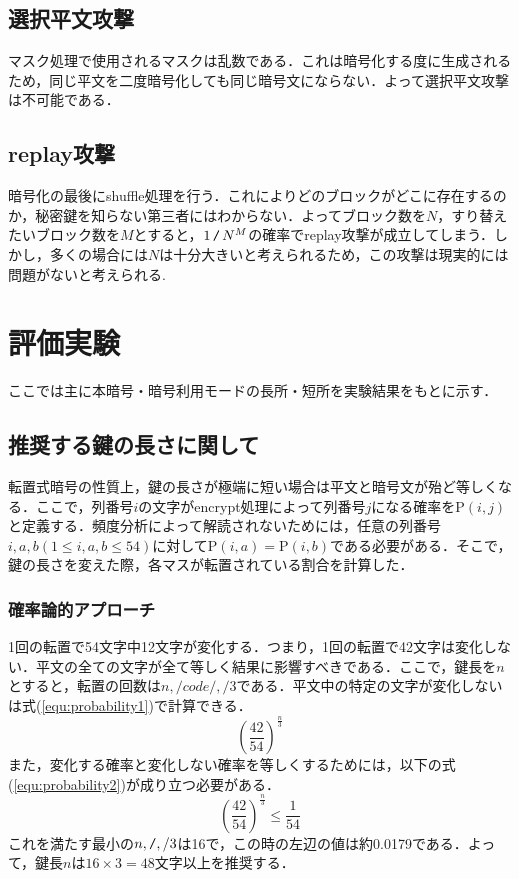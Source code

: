 \documentclass[a4j,titlepage]{jsarticle}
\newcommand{\code}[1]{ \texttt{\detokenize{#1}} }
\begin{document}
\subsection{選択平文攻撃}
マスク処理で使用されるマスクは乱数である．これは暗号化する度に生成されるため，同じ平文を二度暗号化しても同じ暗号文にならない．よって選択平文攻撃は不可能である．

\subsection{replay攻撃}
暗号化の最後にshuffle処理を行う．これによりどのブロックがどこに存在するのか，秘密鍵を知らない第三者にはわからない．よってブロック数を\(N\)，すり替えたいブロック数を\(M\)とすると，\(1\,\code{/}\,N^M\)の確率でreplay攻撃が成立してしまう．しかし，多くの場合には\(N\)は十分大きいと考えられるため，この攻撃は現実的には問題がないと考えられる.

\section{評価実験}
ここでは主に本暗号・暗号利用モードの長所・短所を実験結果をもとに示す．
\subsection{推奨する鍵の長さに関して}
転置式暗号の性質上，鍵の長さが極端に短い場合は平文と暗号文が殆ど等しくなる．ここで，列番号\(i\)の文字がencrypt処理によって列番号\(j\)になる確率を\(\mathrm{P}(i,j)\)と定義する．頻度分析によって解読されないためには，任意の列番号\(i,a,b(1\leq i,a,b\leq 54)\)に対して\(\mathrm{P}(i,a)=\mathrm{P}(i,b)\)である必要がある．そこで，鍵の長さを変えた際，各マスが転置されている割合を計算した．

\subsubsection{確率論的アプローチ}
1回の転置で54文字中12文字が変化する．つまり，1回の転置で42文字は変化しない．平文の全ての文字が全て等しく結果に影響すべきである．ここで，鍵長を\(n\)とすると，転置の回数は\(n,/code{/},/3\)である．平文中の特定の文字が変化しないは式(\ref{equ:probability1})で計算できる．
\[\left(\frac{42}{54}\right)^\frac{n}{3} \label{equ:probability1}\]
また，変化する確率と変化しない確率を等しくするためには，以下の式(\ref{equ:probability2})が成り立つ必要がある．
\[\left(\frac{42}{54}\right)^\frac{n}{3} \leq \frac{1}{54} \label{equ:probability2}\]
これを満たす最小の\(n,\code{/},/3\)は16で，この時の左辺の値は約0.0179である．よって，鍵長\(n\)は\(16\times3=48\)文字以上を推奨する．
\end{document}
